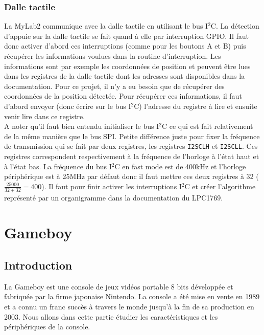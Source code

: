 \documentclass[a4paper]{article}
\begin{document}
\subsubsection{Dalle tactile}
La MyLab2 communique avec la dalle tactile en utilisant le bus I$^2$C. La détection 
d'appuie sur la dalle tactile se fait quand à elle par interruption GPIO. Il faut
donc activer d'abord ces interruptions (comme pour les boutons A et B) puis récupérer 
les informations voulues dans la routine d'interruption. Les informations sont par 
exemple les coordonnées de position et peuvent être lues dans les registres de la 
dalle tactile dont les adresses sont disponibles dans la documentation. Pour ce projet, 
il n'y a eu besoin que de récupérer des coordonnées de la position détectée. Pour
récupérer  ces informations, il faut d'abord envoyer (donc écrire sur le bus I$^2$C)
l'adresse du registre à lire et ensuite venir lire dans ce registre. \\

A noter qu'il faut bien entendu initialiser le bus I$^2$C ce qui est fait relativement de la même
manière que le bus SPI. Petite différence juste pour fixer la fréquence de transmission
qui se fait par deux registres, les registres \texttt{I2SCLH} et \texttt{I2SCLL}.
Ces registres correspondent respectivement à la fréquence de l'horloge à l'état haut et à l'état
bas. La fréquence du bus I$^2$C en fast mode est de 400kHz et l'horloge périphérique
est à 25MHz par défaut donc il faut mettre ces deux registres à 32 ($\frac{25000}{32+32}=400$).
Il faut pour finir activer les interruptions I$^2$C et créer l'algorithme représenté
par un organigramme dans la documentation du LPC1769.


\section{Gameboy}
\subsection{Introduction}
La Gameboy est une console de jeux vidéos portable 8 bits développée et fabriquée
par la firme japonaise Nintendo. La console a été mise en vente en 1989 et a connu
un franc succès à travers le monde jusqu'à la fin de sa production en 2003.
Nous allons dans cette partie étudier les caractéristiques et les périphériques
de la console. \\
\end{document}
